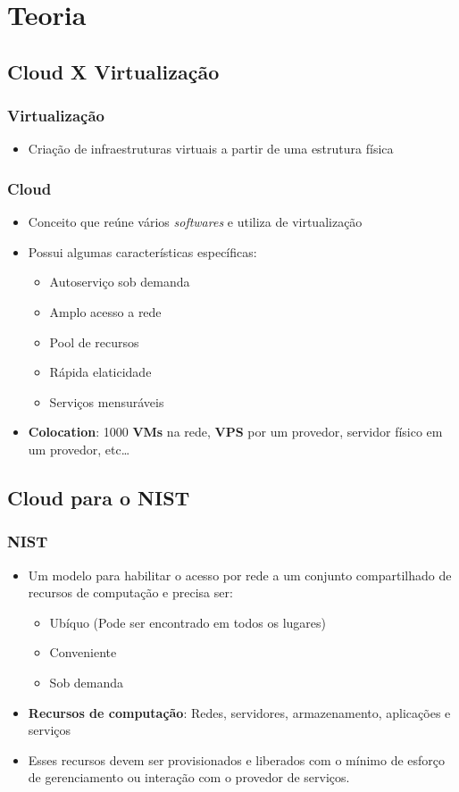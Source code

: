 \section{Teoria}

\subsection{Cloud X Virtualização}

\begin{frame}
	\frametitle{Virtualização}
	\begin{itemize}
		\item Criação de infraestruturas virtuais a partir de uma estrutura física
	\end{itemize}
\end{frame}

\begin{frame}
	\frametitle{Cloud}
	\begin{itemize}
		\item Conceito que reúne vários \textit{softwares} e utiliza de virtualização
		\item Possui algumas características específicas:
			\begin{itemize}
				\item Autoserviço sob demanda
				\item Amplo acesso a rede
				\item Pool de recursos
				\item Rápida elaticidade
				\item Serviços mensuráveis
			\end{itemize}
		\item \textbf{Colocation}: 1000 \textbf{VMs} na rede, \textbf{VPS} por um provedor, servidor físico em um provedor, etc\dots
	\end{itemize}
\end{frame}

\subsection{Cloud para o NIST}

\begin{frame}
	\frametitle{NIST}
	\begin{itemize}
		\item Um modelo para habilitar o acesso por rede a um conjunto compartilhado de recursos de computação e precisa ser:
			\begin{itemize}
				\item Ubíquo (Pode ser encontrado em todos os lugares)
				\item Conveniente
				\item Sob demanda
			\end{itemize}
		\item \textbf{Recursos de computação}: Redes, servidores, armazenamento, aplicações e serviços
		\item Esses recursos devem ser provisionados e liberados com o mínimo de esforço de gerenciamento ou interação com o provedor de serviços.
	\end{itemize}
\end{frame}

